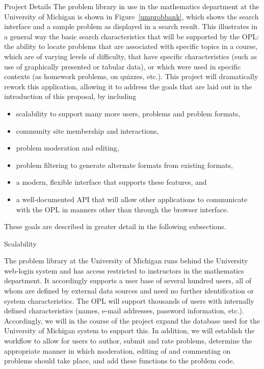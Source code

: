 \documentclass[11pt]{article}
\begin{document}
\begin{section}{Project Details}
The problem library in use in the mathematics department at the University
of Michigan is shown in Figure~\ref{umprobbank}, which shows the
search interface and a sample problem as displayed in a search result.
This illustrates in a general way the basic search characteristics that
will be supported by the OPL: the ability to locate problems that are
associated with specific topics in a course, which are of varying levels
of difficulty, that have specific characteristics (such as use of
graphically presented or tabular data), or which were used in specific
contexts (as homework problems, on quizzes, etc.).  This project will
dramatically rework this application, allowing it to address the goals
that are laid out in the introduction of this proposal, by including
\begin{itemize}
  \item
    scalability to support many more users, problems and problem formats,
  \item 
    community site membership and interactions,
  \item 
    problem moderation and editing,
  \item 
    problem filtering to generate alternate formats from existing
    formats,
  \item
    a modern, flexible interface that supports these features, and
  \item
    a well-documented API that will allow other applications to
    communicate with the OPL in manners other than through the browser
    interface.
\end{itemize}
These goals are described in greater detail in the following subsections.

\begin{subsection}{Scalability}

The problem library at the University of Michigan runs behind the
University web-login system and has access restricted to instructors in
the mathematics department. It accordingly supports a user base of several
hundred users, all of whom are defined by external data sources and need
no further identification or system characteristics. The OPL will support
thousands of users with internally defined characteristics (names, e-mail
addresses, password information, etc.). Accordingly, we will in the course
of the project expand the database used for the University of Michigan
system to support this. In addition, we will establish the workflow to
allow for users to author, submit and rate problems, determine the
appropriate manner in which moderation, editing of and commenting on
problems should take place, and add these functions to the problem code.


\end{subsection}
\end{section}
\end{document}
